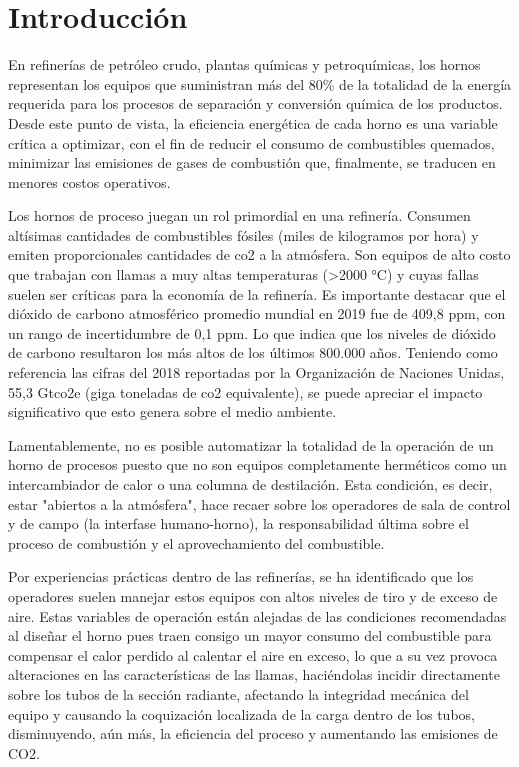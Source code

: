 \chapter*{Introducción}

\par En refinerías de petróleo crudo, plantas químicas y petroquímicas, los hornos representan los equipos que suministran más del 80\% de la totalidad de la energía requerida para los procesos de separación y conversión química de los productos. Desde este punto de vista, la eficiencia energética de cada horno es una variable crítica a optimizar, con el fin de reducir el consumo de combustibles quemados, minimizar las emisiones de gases de combustión que, finalmente, se traducen en menores costos operativos\cite{bib:economics}.

\par Los hornos de proceso juegan un rol primordial en una refinería. Consumen altísimas cantidades de combustibles fósiles (miles de kilogramos por hora) y emiten proporcionales cantidades de \ac{co2} a la atmósfera. Son equipos de alto costo que trabajan con llamas a muy altas temperaturas (\textgreater 2000 °C) y cuyas fallas suelen ser críticas para la economía de la refinería. Es importante destacar que el dióxido de carbono atmosférico promedio mundial en 2019 fue de 409,8 ppm, con un rango de incertidumbre de 0,1 ppm. Lo que indica que los niveles de dióxido de carbono resultaron los más altos de los últimos 800.000 años\cite{bib:clima}. Teniendo como referencia las cifras del 2018 reportadas por la Organización de Naciones Unidas, 55,3 Gt\ac{co2}e (giga toneladas de \ac{co2} equivalente)\cite{onu}, se puede apreciar el impacto significativo que esto genera sobre el medio ambiente. 

\par Lamentablemente, no es posible automatizar la totalidad de la operación de un horno de procesos\cite{bib:instrumentacion} puesto que no son equipos completamente herméticos como un intercambiador de calor o una columna de destilación. Esta condición, es decir, estar "abiertos a la atmósfera", hace recaer sobre los operadores de sala de control y de campo (la interfase humano-horno), la responsabilidad última sobre el proceso de combustión y el aprovechamiento del combustible.  

\par Por experiencias prácticas dentro de las refinerías, se ha identificado que los operadores suelen manejar estos equipos con altos niveles de tiro y de exceso de aire. Estas variables de operación están alejadas de las condiciones recomendadas al diseñar el horno pues traen consigo un mayor consumo del combustible para compensar el calor perdido al calentar el aire en exceso, lo que a su vez provoca alteraciones en las características de las llamas, haciéndolas incidir directamente sobre los tubos de la sección radiante, afectando la integridad mecánica del equipo y causando la coquización localizada de la carga dentro de los tubos, disminuyendo, aún más, la eficiencia del proceso y aumentando las emisiones de CO2.

